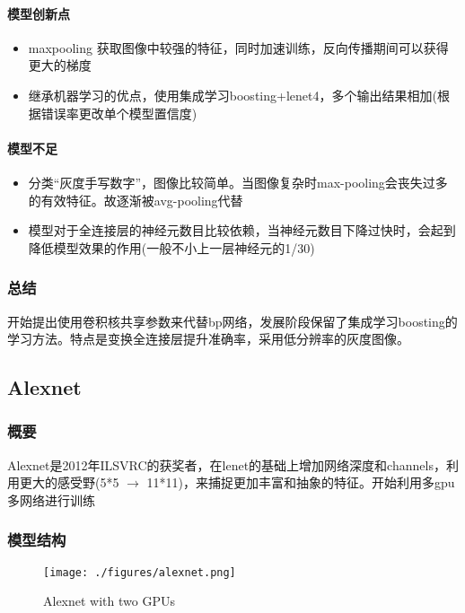\documentclass{article}
\newcommand{\tao}[1]{\todo[color=red!20,size=\footnotesize]{T: #1}{}}
\begin{document}
\begin{CJK}{UTF8}{gbsn}
\paragraph{模型创新点}  
\begin{itemize}
\item maxpooling 获取图像中较强的特征，同时加速训练，反向传播期间可以获得更大的梯度
\item 继承机器学习的优点，使用集成学习boosting+lenet4，多个输出结果相加(根据错误率更改单个模型置信度)
\end{itemize}

\paragraph{模型不足}
\begin{itemize}
\item 分类“灰度手写数字”，图像比较简单。当图像复杂时max-pooling会丧失过多的有效特征。故逐渐被avg-pooling代替
\item 模型对于全连接层的神经元数目比较依赖，当神经元数目下降过快时，会起到降低模型效果的作用(一般不小上一层神经元的1/30)
\end{itemize}

\subsubsection{总结}
开始提出使用卷积核共享参数来代替bp网络，发展阶段保留了集成学习boosting的学习方法。特点是变换全连接层提升准确率，采用低分辨率的灰度图像。


\subsection{Alexnet}
\subsubsection{概要}
Alexnet是2012年ILSVRC的获奖者，在lenet的基础上增加网络深度和channels，利用更大的感受野(5*5 $\rightarrow$ 11*11)，来捕捉更加丰富和抽象的特征。开始利用多gpu多网络进行训练


\subsubsection{模型结构}
\begin{figure}[!h]
    \centering
    \texttt{[image: ./figures/alexnet.png]}
    \caption{Alexnet with two GPUs}
    \label{fig:alexnet}
\end{figure}


\end{CJK}
\end{document}
